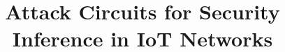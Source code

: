 \documentclass[10pt, conference]{IEEEtran}
\begin{document}
%
\title{Attack Circuits for Security Inference in IoT Networks}


\author{ }

\maketitle




%
%



\end{document}
